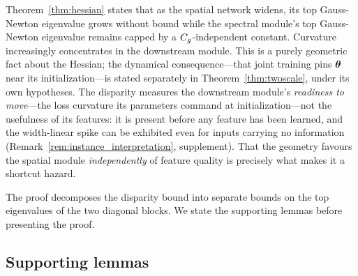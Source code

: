 \begin{remark}[Interpretation]
Theorem~\ref{thm:hessian} states that as the spatial network widens,
its top Gauss-Newton eigenvalue grows without bound while the
spectral module's top Gauss-Newton eigenvalue remains capped by a
$C_g$-independent constant. Curvature increasingly concentrates in
the downstream module. This is a purely geometric fact about the
Hessian; the dynamical consequence---that joint training pins
${\boldsymbol{\theta}}$ near its initialization---is stated separately in
Theorem~\ref{thm:twoscale}, under its own hypotheses. The disparity
measures the downstream module's \emph{readiness to move}---the
loss curvature its parameters command at initialization---not the
usefulness of its features: it is present before any feature has
been learned, and the width-linear spike can be exhibited even for
inputs carrying no information
(Remark~\ref{rem:instance_interpretation}, supplement). That the
geometry favours the spatial module \emph{independently} of feature
quality is precisely what makes it a shortcut hazard.
\end{remark}

The proof decomposes the disparity bound into separate bounds on the
top eigenvalues of the two diagonal blocks. We state the supporting
lemmas before presenting the proof.

\subsection{Supporting lemmas}

